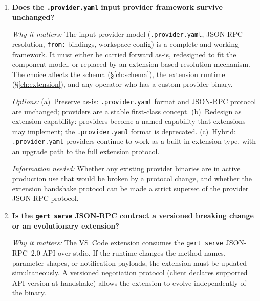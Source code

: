 \begin{enumerate}[label=\textbf{Q\arabic*.}]
    \textit{Options:} (a)~Additive composition only: extensions may only add restrictions (denylist
    entries, redaction patterns); they may never remove host-level restrictions. (b)~Policy
    namespacing: each extension has an isolated policy scope; the host applies all active policies
    via intersection. (c)~Policy delegation: the host can explicitly delegate a policy domain to an
    extension (e.g., redaction rules owned by a data-classification extension).

    \textit{Information needed:} A threat model analysis of what happens when a malicious or
    compromised extension contributes a policy that attempts to weaken host restrictions. This should
    feed into \S\ref{ch:security}.

  \item \textbf{Does the \texttt{.provider.yaml} input provider framework survive unchanged?}

    \textit{Why it matters:} The input provider model (\texttt{.provider.yaml}, JSON-RPC resolution,
    \texttt{from:} bindings, workspace config) is a complete and working framework. It must either be
    carried forward as-is, redesigned to fit the component model, or replaced by an extension-based
    resolution mechanism. The choice affects the schema (\S\ref{ch:schema}), the extension runtime
    (\S\ref{ch:extension}), and any operator who has a custom provider binary.

    \textit{Options:} (a)~Preserve as-is: \texttt{.provider.yaml} format and JSON-RPC protocol are
    unchanged; providers are a stable first-class concept. (b)~Redesign as extension capability:
    providers become a named capability that extensions may implement; the \texttt{.provider.yaml}
    format is deprecated. (c)~Hybrid: \texttt{.provider.yaml} providers continue to work as a
    built-in extension type, with an upgrade path to the full extension protocol.

    \textit{Information needed:} Whether any existing provider binaries are in active production use that
    would be broken by a protocol change, and whether the extension handshake protocol can be made a
    strict superset of the provider JSON-RPC protocol.

  \item \textbf{Is the \texttt{gert serve} JSON-RPC contract a versioned breaking change or an
    evolutionary extension?}

    \textit{Why it matters:} The VS~Code extension consumes the \texttt{gert serve} JSON-RPC~2.0 API
    over stdio. If the runtime changes the method names, parameter shapes, or notification payloads, the
    extension must be updated simultaneously. A versioned negotiation protocol (client declares
    supported API version at handshake) allows the extension to evolve independently of the binary.


\end{enumerate}
